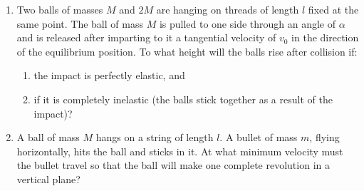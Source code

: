 \documentclass[a4paper,sfsidenotes]{tufte-book}
\begin{document}
\begin{enumerate}[resume*=problems]
\item Two balls of masses $M$ and $2M$ are hanging on threads of length $l$ fixed at the same point. The ball of mass $M$ is pulled to one side through an angle of $\alpha$ and is released after imparting to it a tangential velocity of $v_{0}$ in the direction of the equilibrium position. To what height will the balls rise after collision if: 
\begin{enumerate}
\item the impact is perfectly elastic, and
\item if it is completely inelastic (the balls stick together as a result of the impact)?
\end{enumerate}


\item A ball of mass $M$ hangs on a string of length $l$. A bullet of mass $m$, flying horizontally, hits the ball and sticks in it. At what minimum velocity must the bullet travel so that the ball will make one complete revolution in a vertical plane?


\end{enumerate}
\end{document}
